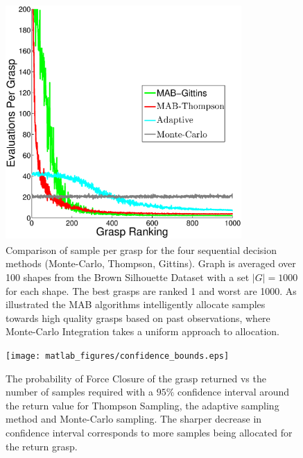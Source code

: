 \documentclass[a4paper, 10pt, conference]{ieeeconf}      %
\begin{document}
\begin{figure}[ht!]
\centering
\includegraphics[width = 9cm, height = 9cm]{matlab_figures/pulls_per_grasp.eps}
\caption{ \footnotesize Comparison of sample per grasp for the four sequential decision methods (Monte-Carlo, Thompson, Gittins). Graph is averaged over 100 shapes from the Brown Silhouette Dataset \cite{brown} with a set $|G|=1000$ for each shape. The best grasps are ranked 1 and worst are 1000. As illustrated the MAB algorithms intelligently allocate samples towards high quality grasps based on past observations, where Monte-Carlo Integration takes a uniform approach to allocation. }

\vspace*{-10pt}
\label{fig:pulls_per_grasp}
\end{figure}

\begin{figure}[ht!]
\centering
\texttt{[image: matlab\_figures/confidence\_bounds.eps]}
\caption{ \footnotesize {} The probability of Force Closure of the grasp returned vs the number of samples required with a $95\%$ confidence interval around the return value for Thompson Sampling, the adaptive sampling method and Monte-Carlo sampling. The sharper decrease in confidence interval corresponds to more samples being allocated for the return grasp. }

\vspace*{-10pt}
\label{fig:confidence}
\end{figure}
\end{document}
